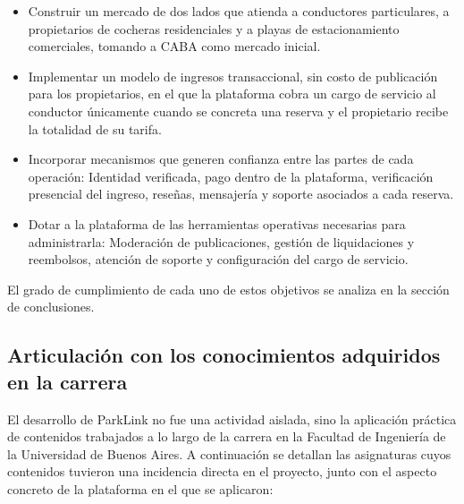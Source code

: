 \begin{itemize}
    \item Construir un mercado de dos lados que atienda a conductores particulares, a propietarios de cocheras residenciales y a playas de estacionamiento comerciales, tomando a CABA como mercado inicial.
    \item Implementar un modelo de ingresos transaccional, sin costo de publicación para los propietarios, en el que la plataforma cobra un cargo de servicio al conductor únicamente cuando se concreta una reserva y el propietario recibe la totalidad de su tarifa.
    \item Incorporar mecanismos que generen confianza entre las partes de cada operación: Identidad verificada, pago dentro de la plataforma, verificación presencial del ingreso, reseñas, mensajería y soporte asociados a cada reserva.
    \item Dotar a la plataforma de las herramientas operativas necesarias para administrarla: Moderación de publicaciones, gestión de liquidaciones y reembolsos, atención de soporte y configuración del cargo de servicio.
\end{itemize}

El grado de cumplimiento de cada uno de estos objetivos se analiza en la sección de conclusiones.

\subsection{Articulación con los conocimientos adquiridos en la carrera}

El desarrollo de ParkLink no fue una actividad aislada, sino la aplicación práctica de contenidos trabajados a lo largo de la carrera en la Facultad de Ingeniería de la Universidad de Buenos Aires. A continuación se detallan las asignaturas cuyos contenidos tuvieron una incidencia directa en el proyecto, junto con el aspecto concreto de la plataforma en el que se aplicaron:


